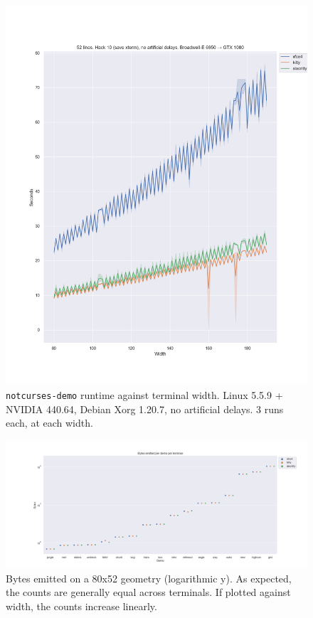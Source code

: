 \begin{figure}[!htb]
\centering
\includegraphics[width=1\textwidth]{media/nvidia-termsdemo.png}
\caption[NVIDIA GTX 1080 benchmarks, varying widths.]{\texttt{notcurses-demo} runtime against terminal width. Linux 5.5.9 + NVIDIA 440.64, Debian Xorg 1.20.7, no artificial delays. 3 runs each, at each width.}
\label{fig:nvidia-full}
\end{figure}

\begin{figure}[!htb]
\centering
\includegraphics[width=1\textwidth]{media/plotbytes.png}
\caption[Bytes output per demo per term.]{Bytes emitted on a 80x52 geometry (logarithmic y). As expected, the counts are generally equal across terminals. If plotted against width, the counts increase linearly.}
\label{fig:nvidia-full}
\end{figure}

